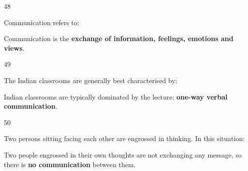 \begin{question}{48}
{Communication refers to:\par}
\begin{explain}
Communication is the \textbf{exchange of information, feelings, emotions and views}.
\end{explain}
\end{question}

\begin{question}{49}
{The Indian classrooms are generally best characterised by:\par}
\begin{explain}
Indian classrooms are typically dominated by the lecture: \textbf{one-way verbal communication}.
\end{explain}
\end{question}

\begin{question}{50}
{Two persons sitting facing each other are engrossed in thinking. In this situation:\par}
\begin{explain}
Two people engrossed in their own thoughts are not exchanging any message, so there is \textbf{no communication} between them.
\end{explain}
\end{question}
